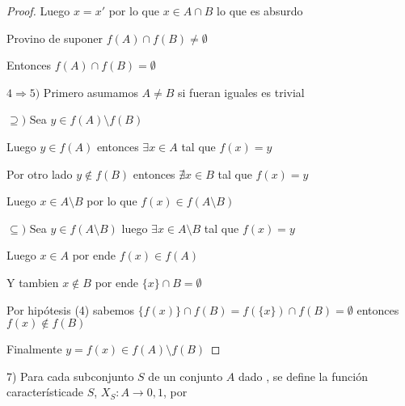 \documentclass[12pt]{article}
\newcommand{\Ra}{\Rightarrow}
\newcommand{\ra}{\rightarrow}
\theoremstyle{definition}
\begin{document}
\begin{enumerate}
\begin{proof}
Luego $x = x'$ por lo que $x \in A \cap B$ lo que es absurdo

Provino de suponer $f(A) \cap f(B) \neq \emptyset$

Entonces $f(A) \cap f(B) = \emptyset$

$4 \Ra 5 )$ Primero asumamos $A \neq B$ si fueran iguales es trivial

$\supseteq )$ Sea $y \in f(A) \setminus f(B)$ 

Luego $y \in f(A)$ entonces $\exists x \in A$ tal que $f(x) = y$

Por otro lado $y \notin f(B)$ entonces $\nexists x \in B$ tal que $f(x) = y$

Luego $x \in A \setminus B$ por lo que $f(x) \in f(A \setminus B)$

$\subseteq )$ Sea $y \in f(A \setminus B)$ luego $\exists x \in A \setminus B$ tal que $f(x) = y$

Luego $x \in A$ por ende $f(x) \in f(A)$

Y tambien $x \notin B$ por ende $\{x\} \cap B = \emptyset$

Por hipótesis (4) sabemos $\{f(x)\} \cap f(B)  = f(\{x\}) \cap f(B) = \emptyset$ entonces $f(x) \notin f(B)$

Finalmente $y = f(x) \in f(A) \setminus f(B)$

\end{proof}
\end{enumerate}

7) Para cada subconjunto $S$ de un conjunto $A$ dado , se define la función característicade $S$, $X_{S}: A \ra {0,1}$, por 
\end{document}
